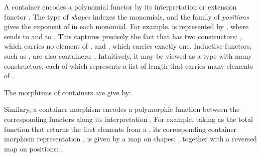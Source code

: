 A container encodes a polynomial functor by its interpretation or extension functor . The type  of \emph{shapes} indexes the monomials, and the family  of \emph{positions} gives the exponent of  in each monomial. For example,  is represented by \;\AgdaSymbol{=}\;\;\;, where  sends  to  and  to . This captures precisely the fact that  has two constructors: , which carries no element of , and , which carries exactly one. Inductive functors, such as , are also containers: \;\AgdaSymbol{=}\;\;\;. Intuitively, it may be viewed as a type with  many constructors, each of which represents a list of length  that carries \; many elements of .

The morphisms of containers are give by:



Similary, a container morphism encodes a polymorphic function between the corresponding functors along its interpretation . For example, taking \;\AgdaSymbol{:}\;\AgdaSymbol{(}\;\AgdaSymbol{:}\;\AgdaSymbol{)}\;\;\;\;\;\; as the total function that returns the first elements from a , its corresponding container morphism representation \;\AgdaSymbol{:}\;\;\;\;\;\;\;, is given by a map on shapes: \;\AgdaSymbol{:}\;\;\;, together with a reversed map on positions: \;\AgdaSymbol{:}\;\AgdaSymbol{(}\;\AgdaSymbol{:}\;\AgdaSymbol{)}\;\;\;\AgdaSymbol{(}\;\AgdaSymbol{)}\;\;\;.

